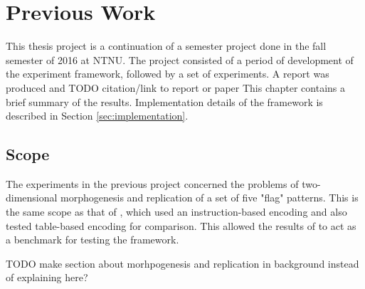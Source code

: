 \chapter{Previous Work}
This thesis project is a continuation of a semester project done in the fall semester of 2016 at NTNU.
The project consisted of a period of development of the experiment framework, followed by a set of experiments.
A report was produced and TODO citation/link to report or paper
This chapter contains a brief summary of the results.
Implementation details of the framework is described in Section \ref{sec:implementation}.


\section{Scope}
The experiments in the previous project concerned the problems of two-dimensional morphogenesis and replication of a set of five "flag" patterns.
This is the same scope as that of \cite{nichele2014evolutionary}, which used an instruction-based encoding and also tested table-based encoding for comparison.
This allowed the results of \cite{nichele2014evolutionary} to act as a benchmark for testing the framework.

TODO make section about morhpogenesis and replication in background instead of explaining here?

